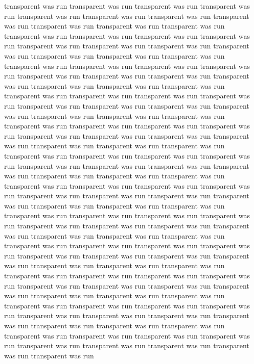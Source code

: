 transparent was run
transparent was run
transparent was run
transparent was run
transparent was run
transparent was run
transparent was run
transparent was run
transparent was run
transparent was run
transparent was run
transparent was run
transparent was run
transparent was run
transparent was run
transparent was run
transparent was run
transparent was run
transparent was run
transparent was run
transparent was run
transparent was run
transparent was run
transparent was run
transparent was run
transparent was run
transparent was run
transparent was run
transparent was run
transparent was run
transparent was run
transparent was run
transparent was run
transparent was run
transparent was run
transparent was run
transparent was run
transparent was run
transparent was run
transparent was run
transparent was run
transparent was run
transparent was run
transparent was run
transparent was run
transparent was run
transparent was run
transparent was run
transparent was run
transparent was run
transparent was run
transparent was run
transparent was run
transparent was run
transparent was run
transparent was run
transparent was run
transparent was run
transparent was run
transparent was run
transparent was run
transparent was run
transparent was run
transparent was run
transparent was run
transparent was run
transparent was run
transparent was run
transparent was run
transparent was run
transparent was run
transparent was run
transparent was run
transparent was run
transparent was run
transparent was run
transparent was run
transparent was run
transparent was run
transparent was run
transparent was run
transparent was run
transparent was run
transparent was run
transparent was run
transparent was run
transparent was run
transparent was run
transparent was run
transparent was run
transparent was run
transparent was run
transparent was run
transparent was run
transparent was run
transparent was run
transparent was run
transparent was run
transparent was run
transparent was run
transparent was run
transparent was run
transparent was run
transparent was run
transparent was run
transparent was run
transparent was run
transparent was run
transparent was run
transparent was run
transparent was run
transparent was run
transparent was run
transparent was run
transparent was run
transparent was run
transparent was run
transparent was run
transparent was run
transparent was run
transparent was run
transparent was run
transparent was run
transparent was run
transparent was run
transparent was run
transparent was run
transparent was run
transparent was run
transparent was run
